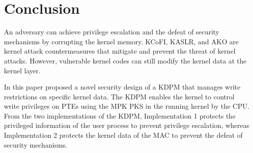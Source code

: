 \section{Conclusion}  \label{section:conclustion}
%

An adversary can achieve privilege escalation and the defeat of security
mechanisms by corrupting the kernel memory.
%
KCoFI, KASLR, and AKO are kernel attack countermeasures that mitigate and
prevent the threat of kernel attacks.
%
However, vulnerable kernel codes can still modify the kernel data at the kernel layer.

%
In this paper proposed a novel security design of a KDPM that manages write
restrictions on specific kernel data.
The KDPM enables the kernel to control write privileges on PTEs using the MPK PKS
in the running kernel by the CPU.
%
%
%
From the two implementations of the KDPM, Implementation 1 protects the
privileged information of the user process to prevent privilege escalation,
whereas Implementation 2 protects the kernel data of the MAC to prevent the
defeat of security mechanisms.

